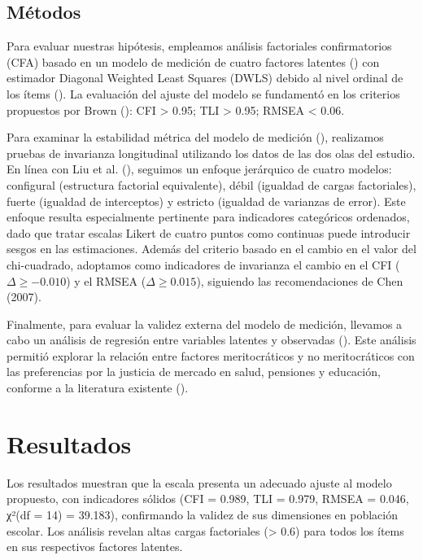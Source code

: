 \documentclass[
  12pt,
  letterpaper,
]{article}
\begin{document}
\subsection{Métodos}\label{muxe9todos}

Para evaluar nuestras hipótesis, empleamos análisis factoriales
confirmatorios (CFA) basado en un modelo de medición de cuatro factores
latentes () con estimador Diagonal Weighted Least Squares (DWLS) debido al
nivel ordinal de los ítems (). La evaluación del ajuste del modelo se fundamentó en los
criterios propuestos por Brown
(): CFI \textgreater{} 0.95;
TLI \textgreater{} 0.95; RMSEA \textless{} 0.06.

Para examinar la estabilidad métrica del modelo de medición
(),
realizamos pruebas de invarianza longitudinal utilizando los datos de
las dos olas del estudio. En línea con Liu et al.
(), seguimos un enfoque jerárquico
de cuatro modelos: configural (estructura factorial equivalente), débil
(igualdad de cargas factoriales), fuerte (igualdad de interceptos) y
estricto (igualdad de varianzas de error). Este enfoque resulta
especialmente pertinente para indicadores categóricos ordenados, dado
que tratar escalas Likert de cuatro puntos como continuas puede
introducir sesgos en las estimaciones. Además del criterio basado en el
cambio en el valor del chi-cuadrado, adoptamos como indicadores de
invarianza el cambio en el CFI (\(\Delta \geq -0.010\)) y el RMSEA
(\(\Delta \geq 0.015\)), siguiendo las recomendaciones de Chen (2007).

Finalmente, para evaluar la validez externa del modelo de medición,
llevamos a cabo un análisis de regresión entre variables latentes y
observadas (). Este
análisis permitió explorar la relación entre factores meritocráticos y
no meritocráticos con las preferencias por la justicia de mercado en
salud, pensiones y educación, conforme a la literatura existente
().

\section{Resultados}\label{resultados}

Los resultados muestran que la escala presenta un adecuado ajuste al
modelo propuesto, con indicadores sólidos (CFI = 0.989, TLI = 0.979,
RMSEA = 0.046, χ²(df = 14) = 39.183), confirmando la validez de sus
dimensiones en población escolar. Los análisis revelan altas cargas
factoriales (\textgreater{} 0.6) para todos los ítems en sus respectivos
factores latentes.
\end{document}
